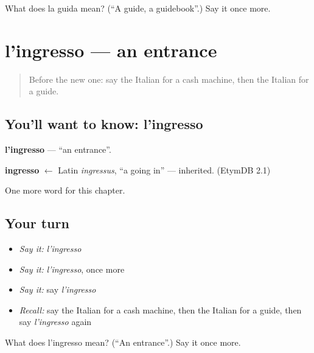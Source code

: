 \begin{tcolorbox}[breakable,colback=teal!4,colframe=teal!35!black,title={Before you move on}]
What does la guida mean? (\textquotedblleft{}A guide, a guidebook\textquotedblright{}.) Say it once more.
\end{tcolorbox}
\section[l'ingresso]{l'ingresso — an entrance}

\label{lesson:IT-C227-ingresso}



\begin{quote}
Before the new one: say the Italian for a cash machine, then the Italian for a guide.
\end{quote}

\subsection*{You'll want to know: l'ingresso}
\textbf{l'ingresso} — \textquotedblleft{}an entrance\textquotedblright{}.

\begin{cousinweb}
\textbf{ingresso} $\leftarrow$ Latin \emph{ingressus}, \textquotedblleft{}a going in\textquotedblright{} — inherited. (EtymDB 2.1)
\end{cousinweb}

\begin{grammarlens}[title={What you've built}]
One more word for this chapter.
\end{grammarlens}

\subsection*{Your turn}
\begin{itemize}
\raggedright
  \item \emph{Say it:} \emph{l'ingresso}
  \item \emph{Say it:} \emph{l'ingresso}, once more
  \item \emph{Say it:} say \emph{l'ingresso}
  \item \emph{Recall:} say the Italian for a cash machine, then the Italian for a guide, then say \emph{l'ingresso} again
\end{itemize}

\begin{tcolorbox}[breakable,colback=teal!4,colframe=teal!35!black,title={Before you move on}]
What does l'ingresso mean? (\textquotedblleft{}An entrance\textquotedblright{}.) Say it once more.
\end{tcolorbox}
